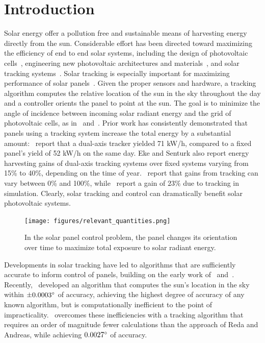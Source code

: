 \documentclass{article}
\begin{document}
\section{Introduction}
Solar energy offer a pollution free and sustainable means of harvesting energy directly from the sun. Considerable effort has been directed toward maximizing the efficiency of end to end solar systems, including the design of photovoltaic cells~\cite{Jervase2001,li2012molecular}, engineering new photovoltaic architectures and materials~\cite{li2005high}, and solar tracking systems~\cite{camacho2012control}. Solar tracking is especially important for maximizing performance of solar panels~\cite{Eke2012,Rizk2008,King2001}. Given the proper sensors and hardware, a tracking algorithm computes the relative location of the sun in the sky throughout the day and a controller orients the panel to point at the sun. The goal is to minimize the angle of incidence between incoming solar radiant energy and the grid of photovoltaic cells, as in~\citet{Eke2012,Benghanem2011,King2001} and~\citet{kalogirou1996design}. Prior work has consistently demonstrated that panels using a tracking system increase the total energy by a substantial amount:~\citet{Eke2012} report that a dual-axis tracker yielded 71 kW/h, compared to a fixed panel's yield of 52 kW/h on the same day. Eke and Senturk also report energy harvesting gains of dual-axis tracking systems over fixed systems varying from 15\% to 40\%, depending on the time of year.~\citet{mousazadeh2009review} report that gains from tracking can vary between 0\% and 100\%, while~\citet{clifford2004design} report a gain of $23\%$ due to tracking in simulation. Clearly, solar tracking and control can dramatically benefit solar photovoltaic systems.

\begin{figure}[t]
\begin{center}
\texttt{[image: figures/relevant\_quantities.png]}
\caption{In the solar panel control problem, the panel changes its orientation over time to maximize total exposure to solar radiant energy.}
\label{fig:solar}
\end{center}
\end{figure}

Developments in solar tracking have led to algorithms that are sufficiently accurate to inform control of panels, building on the early work of~\citet{spencer1971fourier,walraven1978calculating} and~\citet{michalsky1988astronomical}. Recently,~\citet{reda2004solar} developed an algorithm that computes the sun's location in the sky within $\pm 0.0003\degree$ of accuracy, achieving the highest degree of accuracy of any known algorithm, but is computationally inefficient to the point of impracticality.~\citet{Grena2008} overcomes these inefficiencies with a tracking algorithm that requires an order of magnitude fewer calculations than the approach of Reda and Andreas, while achieving $0.0027\degree$ of accuracy.
\end{document}
